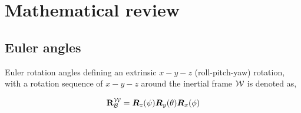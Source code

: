 
\chapter{Mathematical review}
\label{chapter:mathSnippet}

\section{Euler angles}
\label{section:eulerAngles}

Euler rotation angles defining an extrinsic $x-y-z$ (roll-pitch-yaw) rotation, with a rotation sequence of $x-y-z$ around the inertial frame $\mathcal{W}$ is denoted as,

\begin{equation}
	\mathbf{\RotMatrix}_{\BodyFrame}^{\WorldFrame} = \bm{\RotMatrix}_z (\yaw) \bm{\RotMatrix}_y (\pitch) \bm{\RotMatrix}_x (\roll)
\end{equation}

